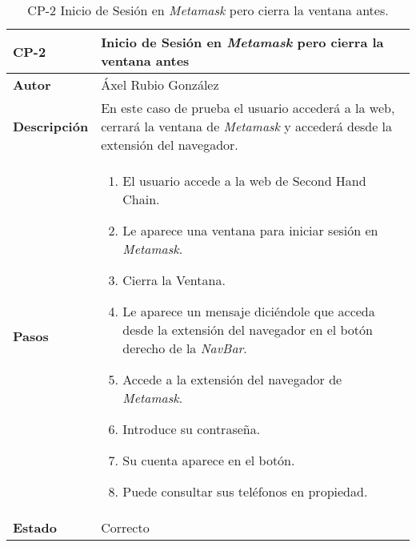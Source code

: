 \begin{table}[p]
	\centering
	\begin{tabularx}{\linewidth}{ p{} p{} }
		\toprule
		\textbf{CP-2}    & \textbf{Inicio de Sesión en \textit{Metamask} pero cierra la ventana antes}\\
		\toprule
		\textbf{Autor}                & Áxel Rubio González \\
		\textbf{Descripción}          & En este caso de prueba el usuario accederá a la web, cerrará la ventana de \textit{Metamask} y accederá desde la extensión del navegador. \\
		\textbf{Pasos}             &
		\begin{enumerate}
			\def\labelenumi{\arabic{enumi}.}
			\tightlist
			\item El usuario accede a la web de Second Hand Chain.
                \item Le aparece una ventana para iniciar sesión en \textit{Metamask}.
                \item Cierra la Ventana.
                \item Le aparece un mensaje diciéndole que acceda desde la extensión del navegador en el botón derecho de la \textit{NavBar}.
                \item Accede a la extensión del navegador de \textit{Metamask}.
                \item Introduce su contraseña.
                \item Su cuenta aparece en el botón.
                \item Puede consultar sus teléfonos en propiedad.
		\end{enumerate}\\
		\textbf{Estado}          & Correcto \\
		\bottomrule
	\end{tabularx}
	\caption{CP-2 Inicio de Sesión en \textit{Metamask} pero cierra la ventana antes.}
\end{table}


